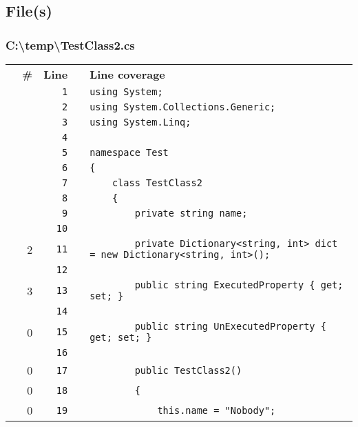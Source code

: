 \documentclass[a4paper,landscape,10pt]{article}
\begin{document}
\subsection{File(s)}
\subsubsection{C:\textbackslash temp\textbackslash TestClass2.cs}
\begin{longtable}[l]{lrrll}
\textbf{} & \textbf{\#} & \textbf{Line} & \textbf{} & \textbf{Line coverage}\\
\cellcolor{gray} &  & \verb~1~ & & \verb~using System;~\\
\cellcolor{gray} &  & \verb~2~ & & \verb~using System.Collections.Generic;~\\
\cellcolor{gray} &  & \verb~3~ & & \verb~using System.Linq;~\\
\cellcolor{gray} &  & \verb~4~ & & \verb~~\\
\cellcolor{gray} &  & \verb~5~ & & \verb~namespace Test~\\
\cellcolor{gray} &  & \verb~6~ & & \verb~{~\\
\cellcolor{gray} &  & \verb~7~ & & \verb~    class TestClass2~\\
\cellcolor{gray} &  & \verb~8~ & & \verb~    {~\\
\cellcolor{gray} &  & \verb~9~ & & \verb~        private string name;~\\
\cellcolor{gray} &  & \verb~10~ & & \verb~~\\
\cellcolor{green} & 2 & \verb~11~ & & \verb~        private Dictionary<string, int> dict = new Dictionary<string, int>();~\\
\cellcolor{gray} &  & \verb~12~ & & \verb~~\\
\cellcolor{green} & 3 & \verb~13~ & & \verb~        public string ExecutedProperty { get; set; }~\\
\cellcolor{gray} &  & \verb~14~ & & \verb~~\\
\cellcolor{red} & 0 & \verb~15~ & & \verb~        public string UnExecutedProperty { get; set; }~\\
\cellcolor{gray} &  & \verb~16~ & & \verb~~\\
\cellcolor{red} & 0 & \verb~17~ & & \verb~        public TestClass2()~\\
\cellcolor{red} & 0 & \verb~18~ & & \verb~        {~\\
\cellcolor{red} & 0 & \verb~19~ & & \verb~            this.name = "Nobody";~\\

\end{longtable}
\end{document}
